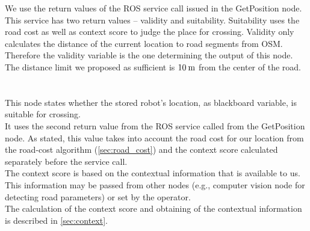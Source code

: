        We use the return values of the ROS service call issued in the GetPosition node. This service has two return values -- validity and suitability. Suitability uses the road cost as well as context score to judge the place for crossing. Validity only calculates the distance of the current location to road segments from OSM.\\
        Therefore the validity variable is the one determining the output of this node. The distance limit we proposed as sufficient is $10\:\rm{m}$ from the center of the road.\\\\
    \\
        This node states whether the stored robot's location, as blackboard variable, is suitable for crossing.\\
        It uses the second return value from the ROS service called from the GetPosition node. As stated, this value takes into account the road cost for our location from the road-cost algorithm (\ref{sec:road_cost}) and the context score calculated separately before the service call.\\
        The context score is based on the contextual information that is available to us. This information may be passed from other nodes (e.g., computer vision node for detecting road parameters) or set by the operator.\\
        The calculation of the context score and obtaining of the contextual information is described in \ref{sec:context}.